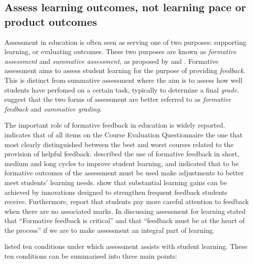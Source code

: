 

\subsection{Assess learning outcomes, not learning pace or product outcomes} %
\label{ssub:aim_to_assess_learning_outcomes_not_learning_pace_or_product_outcomes_}

Assessment in education is often seen as serving one of two purposes: supporting learning, or evaluating outcomes. These two purposes are known as \emph{formative assessment} and \emph{summative assessment}, as proposed by \citet{Scriven:1967} and \citet{Bloom:1969}. Formative assessment aims to assess student learning for the purpose of providing \emph{feedback}. This is distinct from summative assessment where the aim is to assess how well students have perfomed on a certain task, typically to determine a final \emph{grade}. \citet{Biggs:2007} suggest that the two forms of assessment are better referred to as \emph{formative feedback} and \emph{summative grading}.

The important role of formative feedback in education is widely reported. \citet{Ramsden:1992} indicates that of all items on the Course Evaluation Questionnaire \cite{Ramsden:1991} the one that most clearly distinguished between the best and worst courses related to the provision of helpful feedback. \citet{William:2006} described the use of formative feedback in short, medium and long cycles to improve student learning, and indicated that to be formative outcomes of the assessment must be used make adjustments to better meet students' learning needs. \citet{Black:1998} show that substantial learning gains can be achieved by innovations designed to strengthen frequent feedback students receive. Furthermore, \citet{Black:1998} report that students pay more careful attention to feedback when there are no associated marks. In discussing assessment for learning \citet{Brown:2004} stated that ``Formative feedback is critical'' and that ``feedback must be at the heart of the process'' if we are to make assessment an integral part of learning. 

\citet{Gibbs:2004} listed ten conditions under which assessment assists with student learning. These ten conditions can be summarised into three main points: 

%
%


